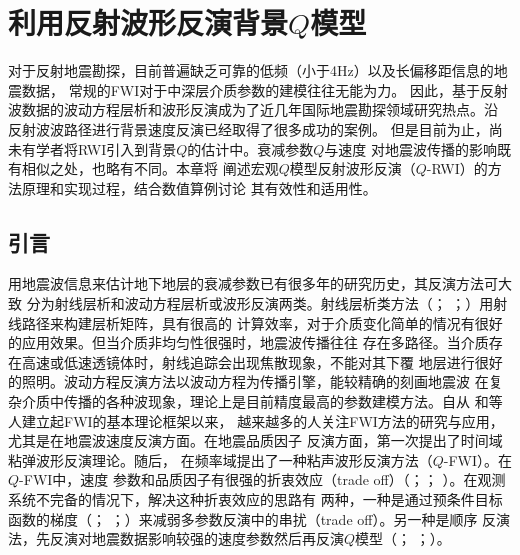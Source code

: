 
\chapter{利用反射波形反演背景$Q$模型}

对于反射地震勘探，目前普遍缺乏可靠的低频（小于4Hz）以及长偏移距信息的地震数据，
常规的FWI对于中深层介质参数的建模往往无能为力。
因此，基于反射波数据的波动方程层析和波形反演成为了近几年国际地震勘探领域研究热点。沿
反射波波路径进行背景速度反演已经取得了很多成功的案例。
但是目前为止，尚未有学者将RWI引入到背景$Q$的估计中。衰减参数$Q$与速度
对地震波传播的影响既有相似之处，也略有不同。本章将
阐述宏观$Q$模型反射波形反演（$Q$-RWI）的方法原理和实现过程，结合数值算例讨论
其有效性和适用性。

\vspace{1.0cm}
\section{引言}

用地震波信息来估计地下地层的衰减参数已有很多年的研究历史，其反演方法可大致
分为射线层析和波动方程层析或波形反演两类。射线层析类方法（；
；）用射线路径来构建层析矩阵，具有很高的
计算效率，对于介质变化简单的情况有很好的应用效果。但当介质非均匀性很强时，地震波传播往往
存在多路径。当介质存在高速或低速透镜体时，射线追踪会出现焦散现象，不能对其下覆
地层进行很好的照明。波动方程反演方法以波动方程为传播引擎，能较精确的刻画地震波
在复杂介质中传播的各种波现象，理论上是目前精度最高的参数建模方法。自从
和等人建立起FWI的基本理论框架以来，
越来越多的人关注FWI方法的研究与应用，尤其是在地震波速度反演方面。在地震品质因子
反演方面，第一次提出了时间域粘弹波形反演理论。随后，
在频率域提出了一种粘声波形反演方法（$Q$-FWI）。在$Q$-FWI中，速度
参数和品质因子有很强的折衷效应（trade off）（；；
）。在观测系统不完备的情况下，解决这种折衷效应的思路有
两种，一种是通过预条件目标函数的梯度（；
；）来减弱多参数反演中的串扰（trade off）。另一种是顺序
反演法，先反演对地震数据影响较强的速度参数然后再反演$Q$模型（；
；）。

